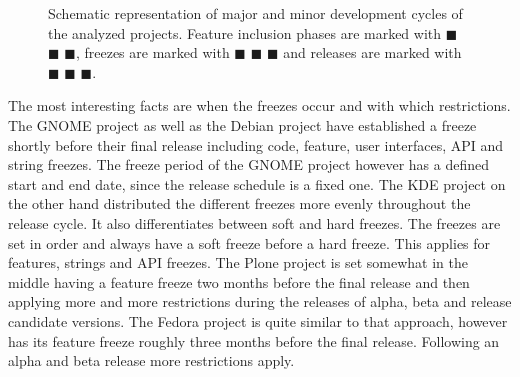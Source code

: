 \begin{figure}[htbp]
  \centering
  \noindent{}

  \noindent{}

  \noindent{}

  \noindent{}

  \noindent{}
  \caption[Representation of Development Cycles]
  {Schematic representation of major and minor development cycles of the
    analyzed projects. Feature inclusion phases are marked with
    \textcolor{plum1}{$\blacksquare$} \textcolor{plum2}{$\blacksquare$}
    \textcolor{plum3}{$\blacksquare$}, freezes are marked with
    \textcolor{skyblue1}{$\blacksquare$} \textcolor{skyblue2}{$\blacksquare$}
    \textcolor{skyblue3}{$\blacksquare$} and releases are marked with
    \textcolor{chameleon1}{$\blacksquare$}
    \textcolor{chameleon2}{$\blacksquare$}
    \textcolor{chameleon3}{$\blacksquare$}.}
\end{figure}

The most interesting facts are when the freezes occur and with which
restrictions. The GNOME project as well as the Debian project have established
a freeze shortly before their final release including code, feature, user
interfaces, \ac{API} and string freezes. The freeze period of the GNOME project
however has a defined start and end date, since the release schedule is a fixed
one. The KDE project on the other hand distributed the different freezes more
evenly throughout the release cycle. It also differentiates between soft and
hard freezes. The freezes are set in order and always have a soft freeze before
a hard freeze. This applies for features, strings and \ac{API} freezes. The
Plone project is set somewhat in the middle having a feature freeze two months
before the final release and then applying more and more restrictions during
the releases of alpha, beta and release candidate versions. The Fedora project
is quite similar to that approach, however has its feature freeze roughly three
months before the final release. Following an alpha and beta release more
restrictions apply.

